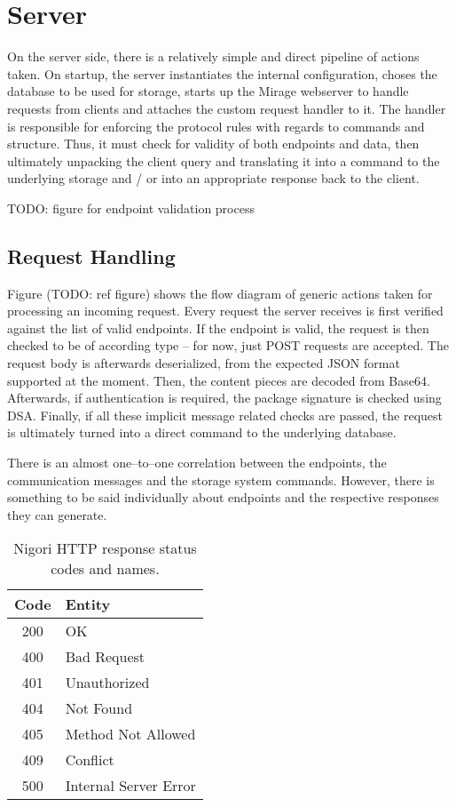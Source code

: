 \section{Server}
On the server side, there is a relatively simple and direct pipeline of actions taken.
On startup, the server instantiates the internal configuration, choses the database to be used for storage, starts up the Mirage webserver to handle requests from clients and attaches the custom request handler to it.
The handler is responsible for enforcing the protocol rules with regards to commands and structure.
Thus, it must check for validity of both endpoints and data, then ultimately unpacking the client query and translating it into a command to the underlying storage and / or into an appropriate response back to the client.

TODO: figure for endpoint validation process

\subsection{Request Handling}
Figure (TODO: ref figure) shows the flow diagram of generic actions taken for processing an incoming request.
Every request the server receives is first verified against the list of valid endpoints.
If the endpoint is valid, the request is then checked to be of according type -- for now, just POST requests are accepted.
The request body is afterwards deserialized, from the expected JSON format supported at the moment.
Then, the content pieces are decoded from Base64.
Afterwards, if authentication is required, the package signature is checked using DSA.
Finally, if all these implicit message related checks are passed, the request is ultimately turned into a direct command to the underlying database.

There is an almost one--to--one correlation between the endpoints, the communication messages and the storage system commands.
However, there is something to be said individually about endpoints and the respective responses they can generate.

\begin{table}[H]
  \centering
  \begin{tabular}{ | c | l | }
    \hline
    \textbf{Code} & \textbf{Entity} \\ \hline
  \hline
    200 & OK \\ \hline
    400 & Bad Request \\ \hline
    401 & Unauthorized \\ \hline
    404 & Not Found \\ \hline
    405 & Method Not Allowed \\ \hline
    409 & Conflict \\ \hline
    500 & Internal Server Error \\ \hline
  \end{tabular}
  \caption{Nigori HTTP response status codes and names.}
  \label{table:http}
\end{table}

